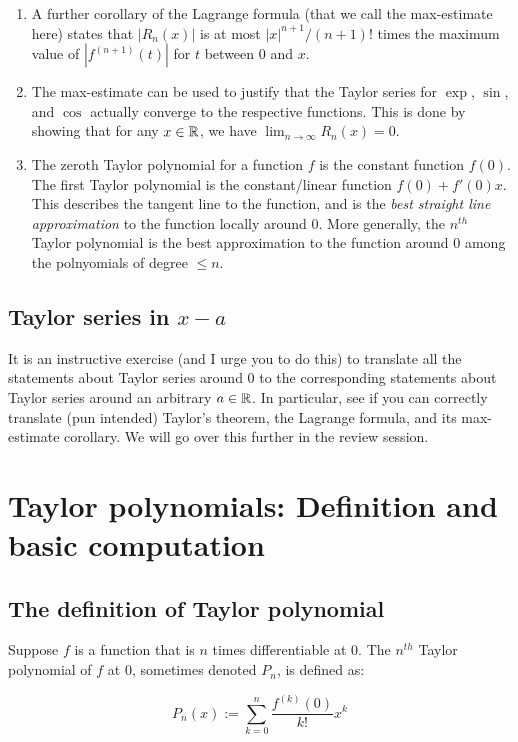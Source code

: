 \documentclass{amsart}
\begin{document}
\begin{enumerate}
\item A further corollary of the Lagrange formula (that we call the
  max-estimate here) states that $|R_n(x)|$ is at most $|x|^{n+1}/(n +
  1)!$ times the maximum value of $|f^{(n + 1)}(t)|$ for $t$ between
  $0$ and $x$.
\item The max-estimate can be used to justify that the Taylor series
  for $\exp$, $\sin$, and $\cos$ actually converge to the respective
  functions. This is done by showing that for any $x \in \mathbb{R}$, we have
  $\lim_{n \to \infty} R_n(x) = 0$.
\item The zeroth Taylor polynomial for a function $f$ is the constant
  function $f(0)$. The first Taylor polynomial is the constant/linear
  function $f(0) + f'(0)x$. This describes the tangent line to the
  function, and is the {\em best straight line approximation} to the
  function locally around $0$. More generally, the $n^{th}$ Taylor
  polynomial is the best approximation to the function around $0$
  among the polnyomials of degree $\le n$.
\end{enumerate}

\subsection{Taylor series in $x - a$}

It is an instructive exercise (and I urge you to do this) to translate
all the statements about Taylor series around $0$ to the corresponding
statements about Taylor series around an arbitrary $a \in \mathbb{R}$. In
particular, see if you can correctly translate (pun intended) Taylor's
theorem, the Lagrange formula, and its max-estimate corollary. We will
go over this further in the review session.

\section{Taylor polynomials: Definition and basic computation}

\subsection{The definition of Taylor polynomial}

Suppose $f$ is a function that is $n$ times differentiable at $0$. The
$n^{th}$ Taylor polynomial of $f$ at $0$, sometimes denoted $P_n$, is
defined as:

$$P_n(x) := \sum_{k=0}^n \frac{f^{(k)}(0)}{k!} x^k$$
\end{document}
